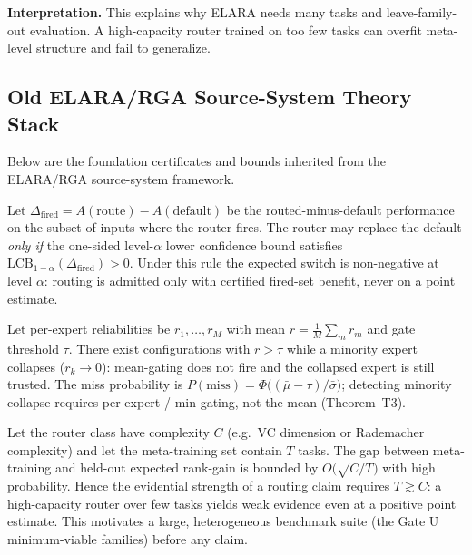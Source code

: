 \medskip
\noindent\textbf{Interpretation.}
This explains why ELARA needs many tasks and leave-family-out evaluation. A high-capacity router trained on too few tasks can overfit meta-level structure and fail to generalize.

\subsection{Old ELARA/RGA Source-System Theory Stack}

Below are the foundation certificates and bounds inherited from the ELARA/RGA source-system framework.

\begin{certificate}
\label{cert:switch}
Let $\Delta_{\mathrm{fired}} = A(\mathrm{route}) - A(\mathrm{default})$ be the routed-minus-default performance on the subset of inputs where the router fires. The router may replace the default \emph{only if} the one-sided level-$\alpha$ lower confidence bound satisfies $\mathrm{LCB}_{1-\alpha}(\Delta_{\mathrm{fired}}) > 0$. Under this rule the expected switch is non-negative at level $\alpha$: routing is admitted only with certified fired-set benefit, never on a point estimate.
\end{certificate}

\begin{diagnostic}
\label{diag:dilution}
Let per-expert reliabilities be $r_1,\dots,r_M$ with mean $\bar r=\tfrac1M\sum_m r_m$ and gate threshold $\tau$. There exist configurations with $\bar r > \tau$ while a minority expert collapses ($r_k\to 0$): mean-gating does not fire and the collapsed expert is still trusted. The miss probability is $P(\mathrm{miss})=\Phi\!\big((\bar\mu-\tau)/\bar\sigma\big)$; detecting minority collapse requires per-expert / min-gating, not the mean (Theorem~T3).
\end{diagnostic}

\begin{slack}
\label{prop:slack}
Let the router class have complexity $C$ (e.g.\ VC dimension or Rademacher complexity) and let the meta-training set contain $T$ tasks. The gap between meta-training and held-out expected rank-gain is bounded by $O\!\big(\sqrt{C/T}\big)$ with high probability. Hence the evidential strength of a routing claim requires $T \gtrsim C$: a high-capacity router over few tasks yields weak evidence even at a positive point estimate. This motivates a large, heterogeneous benchmark suite (the Gate U minimum-viable families) before any claim.
\end{slack}



